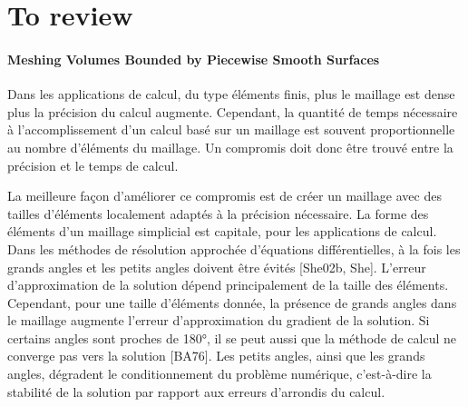 \section{To review}

\paragraph{Meshing Volumes Bounded by Piecewise Smooth Surfaces~\cite{LRineau2007}}{


Dans les applications de calcul, du type éléments finis, plus le maillage est dense plus la précision du calcul augmente. Cependant, la quantité de temps nécessaire à l'accomplissement d'un calcul basé sur un maillage est souvent proportionnelle au nombre d'éléments du maillage. Un compromis doit donc être trouvé entre la précision et le temps de calcul. 

La meilleure façon d'améliorer ce compromis est de créer un maillage avec des tailles d'éléments localement adaptés à la précision nécessaire. La forme des éléments d'un maillage simplicial est capitale, pour les applications de calcul. Dans les méthodes de résolution approchée d'équations différentielles, à la fois les grands angles et les petits angles doivent être évités [She02b, She]. L'erreur d'approximation de la solution dépend principalement de la taille des éléments. Cependant, pour une taille d'éléments donnée, la présence de grands angles dans le maillage augmente l'erreur d'approximation du gradient de la solution. Si certains angles sont proches de 180°, il se peut aussi que la méthode de calcul ne converge pas vers la solution [BA76]. Les petits angles, ainsi que les grands angles, dégradent le conditionnement du problème numérique, c'est-à-dire la stabilité de la solution par rapport aux erreurs d'arrondis du calcul. 


}



